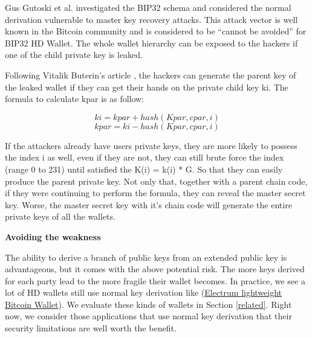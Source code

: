 \begin{adjustwidth}{1cm}{}
    Gus Gutoski et al.\cite{DBLP:conf/fc/GutoskiS15} investigated the BIP32 schema and considered the normal derivation vulnerable to master key recovery attacks. This attack vector is well known in the Bitcoin community and is considered to be “cannot be avoided” for BIP32 HD Wallet. The whole wallet hierarchy can be exposed to the hackers if one of the child private key is leaked.

    Following Vitalik Buterin’s article \cite{Vitalik}, the hackers can generate the parent key of the leaked wallet if they can get their hands on the private child key ki. The formula to calculate kpar is as follow:

    \begin{equation}
        ki  = kpar + hash(Kpar, cpar, i)
    \end{equation}
    \begin{equation}
        kpar = ki - hash(Kpar, cpar, i)
    \end{equation}

    \bigskip
    If the attackers already have users private keys, they are more likely to possess the index i as well, even if they are not, they can still brute force the index (range 0 to 231) until satisfied the K(i) = k(i) * G. So that they can easily produce the parent private key. Not only that, together with a parent chain code, if they were continuing to perform the formula, they can reveal the master secret key. Worse, the master secret key with it’s chain code will generate the entire private keys of all the wallets.

    \bigskip
    {\textbf{Avoiding the weakness}}

    The ability to derive a branch of public keys from an extended public key is advantageous, but it comes with the above potential risk. The more keys derived for each party lead to the more fragile their wallet becomes. In practice, we see a lot of HD wallets still use normal key derivation like (\href{https://electrum.org/#home}{Electrum lightweight Bitcoin Wallet}). We evaluate these kinds of wallets in Section \ref{related}. Right now, we consider those applications that use normal key derivation that their security limitations are well worth the benefit.


\end{adjustwidth}
